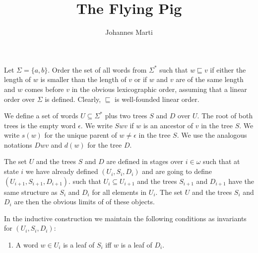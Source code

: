 \documentclass[a4paper]{article}
\title{The Flying Pig}
\author{Johannes Marti}
\begin{document}
\maketitle

Let $\Sigma = \{a,b\}$. Order the set of all words from $\Sigma^*$ such
that $w \sqsubseteq v$ if either the length of $w$ is smaller than the
length of $v$ or if $w$ and $v$ are of the same length and $w$ comes
before $v$ in the obvious lexicographic order, assuming that a linear
order over $\Sigma$ is defined. Clearly, $\sqsubseteq$ is well-founded
linear order.

We define a set of words $U \subseteq \Sigma^*$ plus two trees $S$ and
$D$ over $U$. The root of both trees is the empty word $\epsilon$. We
write $S w v$ if $w$ is an ancestor of $v$ in the tree $S$. We write
$s(w)$ for the unique parent of $w \neq \epsilon$ in the tree $S$. We
use the analogous notations $D w v$ and $d(w)$ for the tree $D$.

The set $U$ and the trees $S$ and $D$ are defined in stages over $i \in
\omega$ such that at state $i$ we have already defined $(U_i,S_i,D_i)$
and are going to define $(U_{i + 1},S_{i + 1},D_{i + 1})$. such that
$U_i \subseteq U_{i + 1}$ and the trees $S_{i + 1}$ and $D_{i + 1}$ have
the same structure as $S_i$ and $D_i$ for all elements in $U_i$. The set
$U$ and the trees $S_i$ and $D_i$ are then the obvious limits of of
these objects.

In the inductive construction we maintain the following conditions as
invariants for $(U_i,S_i,D_i)$:
\begin{enumerate}
 \item A word $w \in U_i$ is a leaf of $S_i$ iff $w$ is a leaf of $D_i$.
\end{enumerate}
\end{document}
